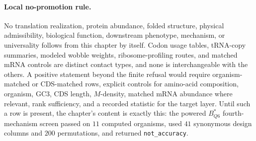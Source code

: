 \paragraph{Local no-promotion rule.}
No translation realization, protein abundance, folded structure, physical admissibility, biological function, downstream phenotype, mechanism, or universality follows from this chapter by itself.  Codon usage tables, tRNA-copy summaries, modeled wobble weights, ribosome-profiling routes, and matched mRNA controls are distinct contact types, and none is interchangeable with the others.  A positive statement beyond the finite refusal would require organism-matched or CDS-matched rows, explicit controls for amino-acid composition, organism, GC3, CDS length, $M$-density, matched mRNA abundance where relevant, rank sufficiency, and a recorded statistic for the target layer.  Until such a row is present, the chapter's content is exactly this: the powered $B^{\ast}_{Q6}$ fourth-mechanism screen passed on $11$ computed organisms, used $41$ synonymous design columns and $200$ permutations, and returned \texttt{not\_accuracy}.